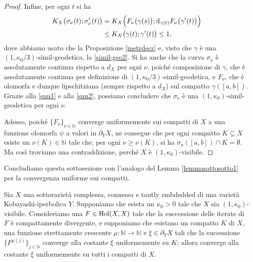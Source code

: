 \begin{proof}
    Infine, per ogni $t$ si ha
    \begin{equation} \label{snu2}
        \begin{aligned}
            K_X\big(\sigma_\nu(t);\sigma_\nu'(t)\big)&=K_X\Big(F_\nu\big(\gamma(s)\big);\mathop{}\!\mathrm{d}_{\gamma(t)}F_\nu\big(\gamma'(t)\big)\Big) \\
            &\le K_X\big(\gamma(t);\gamma'(t)\big) \le 1,
        \end{aligned}
    \end{equation}
    dove abbiamo usato che la Proposizione \ref{metrdecr} e, visto che $\gamma$ è una $(1,\kappa_0/3)$-simil-geodetica, la \eqref{simil-geo2}. Si ha anche che la curva $\sigma_\nu$ è assolutamente continua rispetto a $d_X$ per ogni $\nu$, poiché composizione di $\gamma$, che è assolutamente continua per definizione di $(1,\kappa_0/3)$-simil-geodetica, e $F_\nu$, che è olomorfa e dunque lipschitziana (sempre rispetto a $d_X$) sul compatto $\gamma([a,b])$. Grazie alla \eqref{snu1} e alla \eqref{snu2}, possiamo concludere che $\sigma_\nu$ è una $(1,\kappa_0)$-simil-geodetica per ogni $\nu$.
    
    Adesso, poiché $\{F_\nu\}_{\nu\in\mathbb{N}}$ converge uniformemente sui compatti di $X$ a una funzione olomorfa $\psi$ a valori in $\partial_YX$, ne consegue che per ogni compatto $K\subseteq X$ esiste un $\nu(K)\in\mathbb{N}$ tale che, per ogni $\nu\ge\nu(K)$, si ha $\sigma_\nu([a,b])\cap K=\emptyset$. Ma così troviamo una contraddizione, perché $X$ è $(1,\kappa_0)$-visibile.
\end{proof}

Concludiamo questa sottosezione con l'analogo del Lemma \ref{lemmasottosotto1} per la convergenza uniforme sui compatti.

\begin{lm} \label{lemmasottosotto2}
    Sia $X$ una sottovarietà complessa, connessa e tautly embdedded di una varietà Kobayashi-iperbolica $Y$. Supponiamo che esista un $\kappa_0>0$ tale che $X$ sia $(1,\kappa_0)$-visibile. Consideriamo una $F\in\textnormal{Hol}(X,X)$ tale che la successione delle iterate di $F$ è compattamente divergente, e supponiamo che esistano un compatto $K$ di $X$, una funzione strettamente crescente $\mu:\mathbb{N}\longrightarrow\mathbb{N}$ e $\xi\in\partial_YX$ tali che la successione $\{F^{\mu(j)}\}_{j\in\mathbb{N}}$ converge alla costante $\xi$ uniformemente su $K$; allora converge alla costante $\xi$ uniformemente su tutti i compatti di $X$.
\end{lm}

